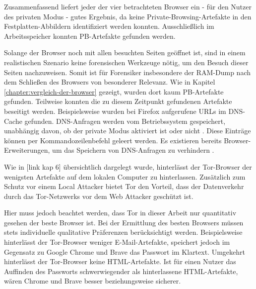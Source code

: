 \begin{comment}
Weiterführende Arbeiten:
> Cross-mode interference \cite{Hedberg.2013}:
	o	the Chrome://memory page displays all the opened tabs in the browser regardless if they are in the usual or private mode -> Nicht mehr aktuell -> Stattdessen: Chrome Task-manager (Ctrl + Esc), Funktioniert auch bei Firefox
> Unser Scope: Process Monitor nach Prozessnamen gefiltert
	- Weiterführend: Nach Pathnamen filtern: "Common Locations"

> Für wen wird Browser entwickelt
> Warum und für wen wird Private Browsing analysiert?
> Ist das Auffinden privater Browsing-Artefakte Schuld von Browser Entwicklern? (Oder Schuld des Betriebssystem, wie in (TODO!) erwähnt)
\end{comment}

Zusammenfassend liefert jeder der vier betrachteten Browser ein - für den Nutzer des privaten Modus - gutes Ergebnis, da keine Private-Browsing-Artefakte in den Festplatten-Abbildern identifiziert werden konnten. 
Ausschließlich im Arbeitsspeicher konnten PB-Artefakte gefunden werden.

Solange der Browser noch mit allen besuchten Seiten geöffnet ist, sind in einem realistischen Szenario keine forensischen Werkzeuge nötig, um den Besuch dieser Seiten nachzuweisen. Somit ist für Forensiker insbesondere der RAM-Dump nach dem Schließen des Browsers von besonderer Relevanz. 
Wie in Kapitel \ref{chapter:vergleich-der-browser} gezeigt, wurden dort kaum PB-Artefakte gefunden.
Teilweise konnten die zu diesem Zeitpunkt gefundenen Artefakte beseitigt werden.
Beispielsweise wurden bei Firefox aufgerufene URLs im DNS-Cache gefunden. DNS-Anfragen werden vom Betriebssystem gespeichert, unabhängig davon, ob der private Modus aktiviert ist oder nicht \cite{Satvat.2014}. Diese Einträge können per Kommandozeilenbefehl geleert werden. Es existieren bereits Browser-Erweiterungen, um das Speichern von DNS-Anfragen zu verhindern \cite{Satvat.2014}.

Wie in [link kap 6] übersichtlich dargelegt wurde, hinterlässt der Tor-Browser der wenigsten Artefakte auf dem lokalen Computer zu hinterlassen. 
Zusätzlich zum Schutz vor einem Local Attacker bietet Tor den Vorteil, dass der Datenverkehr durch das Tor-Netzwerks vor dem Web Attacker geschützt ist. 

Hier muss jedoch beachtet werden, dass Tor in dieser Arbeit nur quantitativ gesehen der beste Browser ist.
Bei der Ermittlung des besten Browsers müssen stets individuelle qualitative Präferenzen berücksichtigt werden. 
Beispielsweise hinterlässt der Tor-Browser weniger E-Mail-Artefakte, speichert jedoch im Gegensatz zu Google Chrome und Brave das Passwort im Klartext. Umgekehrt hinterlässt der Tor-Browser keine HTML-Artefakte.
Ist für einen Nutzer das Auffinden des Passworts schwerwiegender als hinterlassene HTML-Artefakte, wären Chrome und Brave \glqq{}besser\grqq{} beziehungsweise \glqq{}sicherer\grqq{}.

